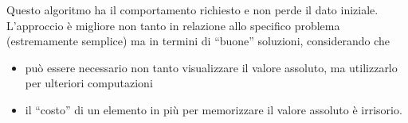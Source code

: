 Questo algoritmo ha il comportamento richiesto e non perde il dato iniziale. L'approccio \`e migliore non tanto in relazione allo specifico problema (estremamente semplice) ma in termini di ``buone'' soluzioni, considerando che\begin{itemize} 
\item pu\`o essere necessario non tanto visualizzare il valore assoluto, ma utilizzarlo per ulteriori computazioni
\item il ``costo'' di un elemento in pi\`u per memorizzare il valore assoluto \`e irrisorio.
\end{itemize}
